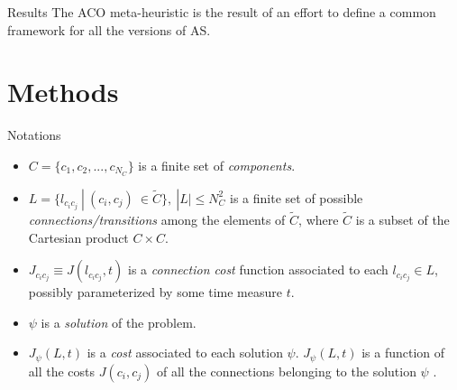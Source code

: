 \documentclass[table]{beamer}
\begin{document}
\begin{frame}{Results}
	The ACO meta-heuristic is the result of an effort to define a common framework for all the versions of AS.
\end{frame}

\section{Methods}
\begin{frame}{Notations}
	\begin{itemize}
		\item $ C = \{c_1,c_2,...,c_{N_C} \} $ is a finite set of \textit{components}.
		
		\item $ L = \{l_{c_{i}c_{j}}\ |\ (c_i,c_j)\ \in  \tilde{C}\},\ |L| \leq N^{2}_C $ is a finite set of possible \textit{connections/transitions} among the elements of $ \tilde{C} $, where $ \tilde{C} $ is a subset of the Cartesian product $ C\times C $.
		
		\item $ J_{c_ic_j} \equiv J(l_{c_ic_j}, t) $ is a \emph{connection cost} function associated to each $l_{c_ic_j} \in L $, possibly parameterized by some time measure $t$.
		
		\item $ \psi $ is a \emph{solution} of the problem.
		\item $ J_{\psi}(L,t) $ is a \emph{cost} associated to each solution 	$\psi $.  $ J_{\psi}(L,t) $ is a function of all the costs $ J(c_i,c_j) $ of all the connections belonging to the solution $\psi $ .

	\end{itemize}
\end{frame}
\end{document}
